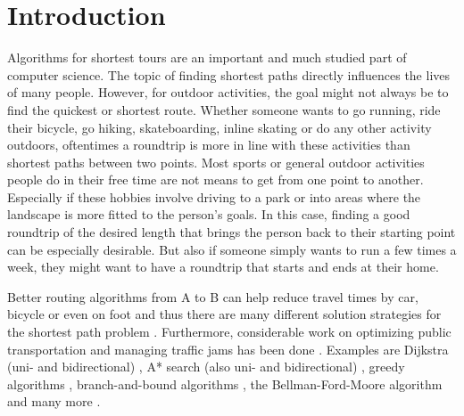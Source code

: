 \chapter{Introduction}
\label{chapter:introduction}


Algorithms for shortest tours are an important and much studied part of computer science.
The topic of finding shortest paths directly influences the lives of many people.
However, for outdoor activities, the goal might not always be to find the quickest or shortest route.
Whether someone wants to go running, ride their bicycle, go hiking, skateboarding, inline skating or do any other activity outdoors, oftentimes a roundtrip is more in line with these activities than shortest paths between two points.
Most sports or general outdoor activities people do in their free time are not means to get from one point to another.
Especially if these hobbies involve driving to a park or into areas where the landscape is more fitted to the person's goals.
In this case, finding a good roundtrip of the desired length that brings the person back to their starting point can be especially desirable.
But also if someone simply wants to run a few times a week, they might want to have a roundtrip that starts and ends at their home. 


Better routing algorithms from A to B can help reduce travel times by car, bicycle or even on foot and thus there are many different solution strategies for the shortest path problem \cite{cherkassky_shortest_1996, deo_shortest-path_1984, gallo_shortest_1988, madkour_survey_2017, sommer_shortest-path_2014, wayahdi_greedy_2021}.
Furthermore, considerable work on optimizing public transportation \cite{bast_route_2016, delling_round-based_2015} and managing traffic jams has been done \cite{delling_time-dependent_2011, delling_customizable_2017}. 
Examples are Dijkstra (uni- and bidirectional) \cite{madkour_survey_2017, sommer_shortest-path_2014, wayahdi_greedy_2021}, A* search (also uni- and bidirectional) \cite{madkour_survey_2017, sommer_shortest-path_2014, wayahdi_greedy_2021}, greedy algorithms \cite{madkour_survey_2017, wayahdi_greedy_2021}, branch-and-bound algorithms \cite{lawler_branch-and-bound_1966}, the Bellman-Ford-Moore algorithm \cite{cherkassky_shortest_1996} and many more \cite{delling_engineering_2009, gallo_shortest_1988, sommer_shortest-path_2014}.

